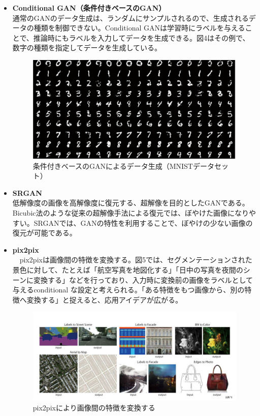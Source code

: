 \documentclass{jarticle}
\begin{document}
\begin{itemize}
\item \textbf{Conditional GAN（条件付きベースのGAN）}\\
通常のGANのデータ生成は、ランダムにサンプルされるので、生成されるデータの種類を制御できない。Conditional GANは学習時にラベルを与えることで、推論時にもラベルを入力してデータを生成できる。図4はその例で、数字の種類を指定してデータを生成している。
\begin{figure}[h]
\centering
\includegraphics[width=12cm]{pic5.png}
\caption{条件付きベースのGANによるデータ生成（MNISTデータセット）}
\label{GAN4}
\end{figure}

\item \textbf{SRGAN}\\
低解像度の画像を高解像度に復元する、超解像を目的としたGANである。Bicubic法のような従来の超解像手法による復元では、ぼやけた画像になりやすい。SRGANでは、GANの特性を利用することで、ぼやけの少ない画像の復元が可能である。
\item \textbf{pix2pix}\\
　pix2pixは画像間の特徴を変換する。図5では、セグメンテーションされた景色に対して、たとえば「航空写真を地図化する」「日中の写真を夜間のシーンに変換する」などを行っており、入力時に変換前の画像をラベルとして与えるconditional な設定と考えられる。「ある特徴をもつ画像から、別の特徴へ変換する」と捉えると、応用アイデアが広がる。
\begin{figure}[h]
\centering
\includegraphics[width=12cm]{pic6.jpg}
\caption{pix2pixにより画像間の特徴を変換する}
\label{GAN5}
\end{figure}


\end{itemize}
\end{document}
